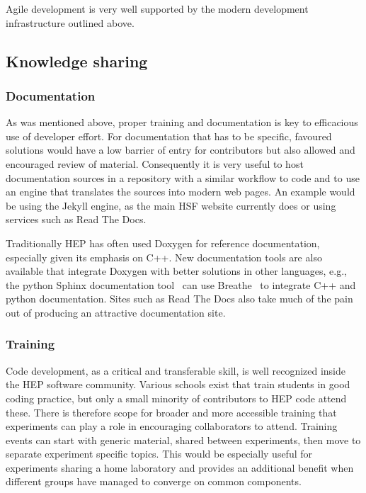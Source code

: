 \documentclass[12pt,a4paper]{article}
\begin{document}
Agile development is very well supported by the modern development
infrastructure outlined above.~

\hypertarget{knowledge-sharing}{%
\subsection{Knowledge sharing}\label{knowledge-sharing}}

\hypertarget{documentation}{%
\subsubsection{Documentation}\label{documentation}}

As was mentioned above, proper training and documentation is key to
efficacious use of developer effort. For documentation that has to be
specific, favoured solutions would have a low barrier of entry for
contributors but also allowed and encouraged review of material.
Consequently it is very useful to host documentation sources in a
repository with a similar workflow to code and to use an engine that
translates the sources into modern web pages. An example would be using
the Jekyll engine, as the main HSF website currently does or using
services such as Read The Docs.

Traditionally HEP has often used Doxygen\cite{Doxygen} for reference
documentation, especially given its emphasis on C++. New documentation tools are also
available that integrate Doxygen with better solutions in other
languages, e.g., the python Sphinx documentation tool~\cite{Sphinx} can use
Breathe~\cite{breathe} to integrate C++ and python documentation. Sites such as
Read The Docs also take much of the pain out of producing an attractive documentation site.

\hypertarget{training}{%
\subsubsection{Training}\label{training}}

Code development, as a critical and transferable skill, is well
recognized inside the HEP software community. Various schools exist that
train students in good coding practice, but only a small minority of
contributors to HEP code attend these. There is therefore scope for
broader and more accessible training that experiments can play a role in
encouraging collaborators to attend. Training events can start with
generic material, shared between experiments, then move to separate
experiment specific topics. This would be especially useful for
experiments sharing a home laboratory and provides an additional benefit
when different groups have managed to converge on common components.
\end{document}
